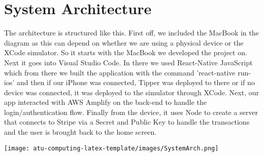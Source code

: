 \section{System Architecture}
The architecture is structured like this. First off, we included the MacBook in the diagram as this can depend on whether we are using a physical device or the XCode simulator. So it starts with the MacBook we developed the project on. Next it goes into Visual Studio Code. In there we used React-Native JavaScript which from there we built the application with the command 'react-native run-ios' and then if our iPhone was connected, Tipper was deployed to there or if no device was connected, it was deployed to the simulator through XCode. Next, our app interacted with AWS Amplify on the back-end to handle the login/authentication flow. Finally from the device, it uses Node to create a server that connects to Stripe via a Secret and Public Key to handle the transactions and the user is brought back to the home screen. 
\begin{center}
    \texttt{[image: atu-computing-latex-template/images/SystemArch.png]}
\end{center}

